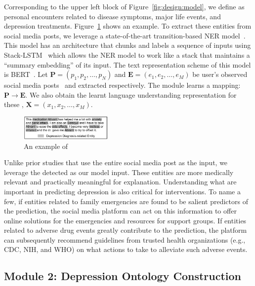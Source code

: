 Corresponding to the upper left block of Figure~\ref{fig:design:model}, we define \entity as personal encounters related to disease symptoms, major life events, and depression treatments. Figure~\ref{fig:design:extract} shows an example. To extract these entities from social media posts, we leverage a state-of-the-art transition-based NER model~\citep{lample_neural_2016}. This model has an architecture that chunks and labels a sequence of inputs using Stack-LSTM~\citep{dyer_transition-based_2015} which allows the NER model to work like a stack that maintains a “summary embedding” of its input. The text representation scheme of this model is BERT~\citep{devlin_bert_2018}. Let $\boldsymbol{P} = \left(p_1,p_2,\ldots, p_N\right)$ and $\boldsymbol{E} = \left(e_1,e_2,\ldots, e_M\right)$ be user's observed social media posts~ and extracted \entity respectively. The module learns a mapping: $\boldsymbol{P} \longrightarrow \boldsymbol{E}$. We also obtain the learnt language understanding representation for these \entity, $\boldsymbol{X} =\left(x_1,x_2,\ldots, x_M\right)$.  

\begin{figure}[h]
    \centering
    \includegraphics[width=0.4\textwidth]{imgs/example-ner.png}
    \caption{An example of \entity}
    \label{fig:design:extract}
\end{figure}

Unlike prior studies that use the entire social media post as the input, we leverage the detected \entity as our model input. These entities are more medically relevant and practically meaningful for explanation. Understanding what \entity are important in predicting depression is also critical for interventions. To name a few, if entities related to family emergencies are found to be salient predictors of the prediction, the social media platform can act on this information to offer online solutions for the emergencies and resources for support groups. If entities related to adverse drug events greatly contribute to the prediction, the platform can subsequently recommend guidelines from trusted health organizations (e.g., CDC, NIH, and WHO) on what actions to take to alleviate such adverse events. 


\subsection{Module 2: Depression Ontology Construction}\label{sec:design:module2}


